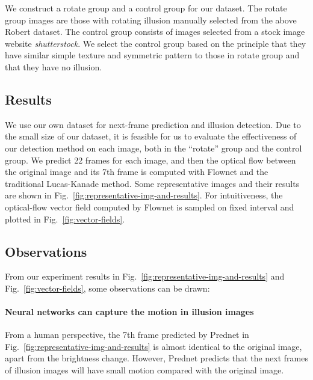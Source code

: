 \documentclass[journal]{IEEEtran}
\begin{document}
  
  We construct a rotate group and a control group for our dataset. The rotate group images are those with rotating illusion manually selected from the above Robert dataset. The control group consists of images selected from a stock image website \emph{shutterstock}. We select the control group based on the principle that they have similar simple texture and symmetric pattern to those in rotate group and that they have no illusion.
  
  \subsection{Results}
  
  We use our own dataset for next-frame prediction and illusion detection. Due to the small size of our dataset, it is feasible for us to evaluate the effectiveness of our detection method on each image, both in the ``rotate'' group and the control group. We predict 22 frames for each image, and then the optical flow between the original image and its 7th frame is computed with Flownet and the traditional Lucas-Kanade method. Some representative images and their results are shown in Fig.~\ref{fig:representative-img-and-results}. For intuitiveness, the optical-flow vector field computed by Flownet is sampled on fixed interval and plotted in Fig.~\ref{fig:vector-fields}.
  
  \subsection{Observations}
  
  From our experiment results in Fig.~\ref{fig:representative-img-and-results} and Fig.~\ref{fig:vector-fields}, some observations can be drawn:
  
  \paragraph{Neural networks can capture the motion in illusion images} From a human perspective, the 7th frame predicted by Prednet in Fig.~\ref{fig:representative-img-and-results} is almost identical to the original image, apart from the brightness change. However, Prednet predicts that the next frames of illusion images will have small motion compared with the original image.
  
\end{document}
